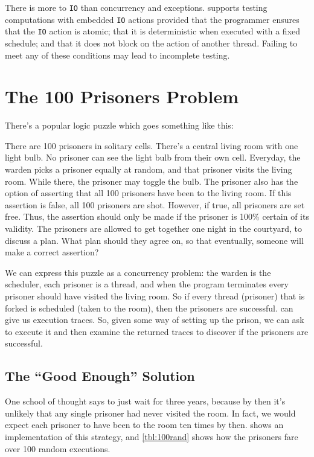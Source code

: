 There is more to \verb|IO| than concurrency and exceptions.  \dejafu{} supports
testing computations with embedded \verb|IO| actions provided that the
programmer ensures that the \verb|IO| action is atomic; that it is deterministic
when executed with a fixed schedule; and that it does not block on the action of
another thread.  Failing to meet any of these conditions may lead to incomplete
testing.

\section{The 100 Prisoners Problem}
\label{sec:dejafu-100}

There's a popular logic puzzle which goes something like this:

\begin{displayquote}
  There are 100 prisoners in solitary cells.  There's a central living
  room with one light bulb.  No prisoner can see the light bulb from
  their own cell.  Everyday, the warden picks a prisoner equally at
  random, and that prisoner visits the living room.  While there, the
  prisoner may toggle the bulb.  The prisoner also has the option of
  asserting that all 100 prisoners have been to the living room.  If
  this assertion is false, all 100 prisoners are shot.  However, if
  true, all prisoners are set free.  Thus, the assertion should only
  be made if the prisoner is 100\% certain of its validity.  The
  prisoners are allowed to get together one night in the courtyard, to
  discuss a plan.  What plan should they agree on, so that eventually,
  someone will make a correct assertion?
\end{displayquote}

We can express this puzzle as a concurrency problem: the warden is the
scheduler, each prisoner is a thread, and when the program terminates
every prisoner should have visited the living room.  So if every
thread (prisoner) that is forked is scheduled (taken to the room),
then the prisoners are successful.  \dejafu{} can give us execution
traces.  So, given some way of setting up the prison, we can ask
\dejafu{} to execute it and then examine the returned traces to
discover if the prisoners are successful.

\subsection{The ``Good Enough'' Solution}

One school of thought says to just wait for three years, because by
then it's unlikely that any single prisoner had never visited the
room.  In fact, we would expect each prisoner to have been to the room
ten times by then.   shows an implementation of this
strategy, and \cref{tbl:100rand} shows how the prisoners fare over 100
random executions.

